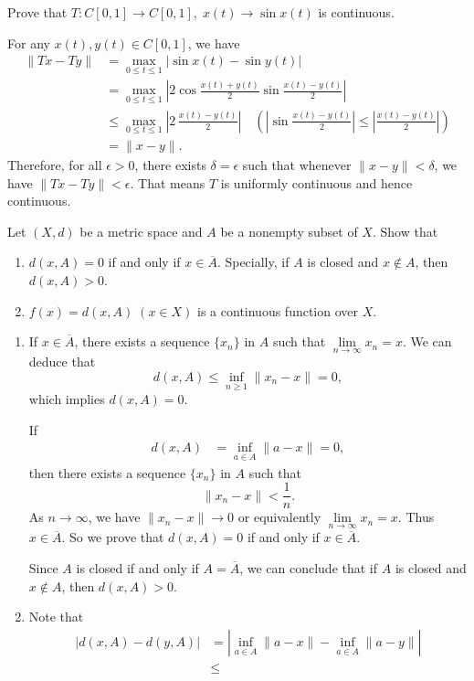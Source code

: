 \documentclass[12pt,letterpaper,boxed]{hmcpset}
\begin{document}
\begin{problem}[1.14]
	Prove that $T:C[0,1]\to C[0,1],\;x(t)\to \sin x(t)$ is continuous.
\end{problem}
\begin{solution}
	For any $x(t), y(t)\in C[0,1]$, we have
	\begin{align*}
		\|Tx-Ty\|&=\max_{0\le t\le 1}\left|\sin x(t)-\sin y(t)\right|\\
		&=\max_{0\le t\le 1}\left|2\cos\frac{x(t)+y(t)}{2}\sin\frac{x(t)-y(t)}{2}\right|\\
		&\le \max_{0\le t\le 1}\left|2\,\frac{x(t)-y(t)}{2}\right|\quad\left(\left|\sin\frac{x(t)-y(t)}{2}\right|\le \left|\frac{x(t)-y(t)}{2}\right|\right)\\
		&=\|x-y\|.
	\end{align*}
	Therefore, for all $\epsilon>0$, there exists $\delta=\epsilon$ such that whenever $\|x-y\|<\delta$, we have $\|Tx-Ty\|<\epsilon$. That means $T$ is uniformly continuous and hence continuous.
\end{solution}

\begin{problem}[1.15]
	Let $(X,d)$ be a metric space and $A$ be a nonempty subset of $X$. Show that
	\begin{enumerate}[(1)]
		\item $d(x,A)=0$ if and only if $x\in \overline{A}$. Specially, if $A$ is closed and $x\notin A$, then $d(x,A)>0$.
		\item $f(x)=d(x,A)\;(x\in X)$ is a continuous function over $X$.
	\end{enumerate}
\end{problem}
\begin{solution}
	\begin{enumerate}[(1)]
		\item If $x\in \overline{A}$, there exists a sequence $\{x_n\}$ in $A$ such that $\lim\limits_{n\to\infty}x_n=x$. We can deduce that 
		\[
			d(x,A)\le \inf_{n\ge1}\|x_n-x\|=0,
		\]
		which implies $d(x,A)=0$. 

		If 
		\begin{align*}
			d(x,A)&=\inf_{a\in A}\|a-x\|=0,
		\end{align*}
		then there exists a sequence $\{x_n\}$ in $A$ such that
		\[
			\|x_n-x\|<\frac{1}{n}.
		\]
		As $n\to \infty$, we have $\|x_n-x\|\to 0$ or equivalently $\lim\limits_{n\to\infty}x_n=x$. Thus $x\in \overline{A}$. So we prove that $d(x,A)=0$ if and only if $x\in \overline{A}$.

		Since $A$ is closed if and only if $A=\overline{A}$, we can conclude that if $A$ is closed and $x\notin A$, then $d(x,A)>0$.
		\item Note that
		\begin{align*}
			|d(x,A)-d(y,A)|&=\left|\inf_{a\in A}\|a-x\|-\inf_{a\in A}\|a-y\|\right|\\
			&\le
		\end{align*}
	\end{enumerate}
\end{solution}
\end{document}
